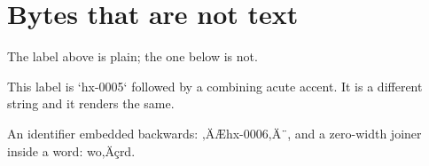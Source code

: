 \section{Bytes that are not text}\label{hx-0300}

\begin{lemma}\label{hx-0005}
The label above is plain; the one below is not.
\end{lemma}

\begin{lemma}\label{hx-0005ÃÅ}
This label is `hx-0005` followed by a combining acute accent. It is a different string and it renders the same.
\end{lemma}

\begin{lemma}\label{hx-0006}
An identifier embedded backwards: ‚ÄÆhx-0006‚Ä¨, and a zero-width joiner inside a word: wo‚Äçrd.
\end{lemma}

